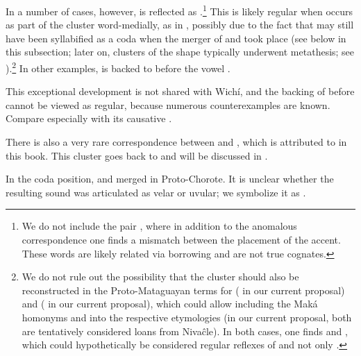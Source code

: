 In a number of cases, however,  is reflected as .\footnote{We do not include the pair  \recind {}, where in addition to the anomalous correspondence  \recind {} one finds a mismatch between the placement of the accent. These words are likely related via borrowing and are not true cognates.} This is likely regular when  occurs as part of the cluster  word-medially, as in , possibly due to the fact that  may still have been syllabified as a coda when the merger of  and  took place (see below in this subsection; later on, clusters of the shape  typically underwent metathesis; see ).\footnote{We do not rule out the possibility that the cluster  should also be reconstructed in the Proto-Mataguayan terms for ( in our current proposal) and ( in our current proposal), which could allow including the Maká homonyms  and  into the respective etymologies (in our current proposal, both are tentatively considered loans from Nivaĉle). In both cases, one finds  and , which could hypothetically be considered regular reflexes of  and not only .} In other examples,  is backed to  before the vowel .

\begin{exe}
    \ex \kha \label{k-k-kha}
    \ex \vomitv
    \ex \vomitn
    \ex \feed \label{k-k-feed}
\end{exe}

This exceptional development is not shared with Wichí, and the backing of  before  cannot be viewed as regular, because numerous counterexamples are known. Compare especially  with its causative .

\begin{exe}
    \ex \eatkun \label{k-kj-eatkun}
\end{exe}

There is also a very rare correspondence between  and , which is attributed to  in this book. This cluster goes back to  and will be discussed in .

In the coda position,  and  merged in Proto-Chorote. It is unclear whether the resulting sound was articulated as velar or uvular; we symbolize it as .

